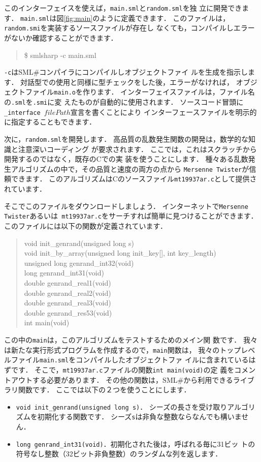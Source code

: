 \documentclass{jbook}
\newcommand{\smlsharp}{SML\#}
\newenvironment{program}{\begin{quote}\begin{tt}}%
                        {\end{tt}\end{quote}}
\begin{document}
	このインターフェイスを使えば，{\tt main.sml}と{\tt random.sml}を独
立に開発できます．
	{\tt main.sml}は図\ref{fig:main}のように定義できます．
	このファイルは，{\tt random.smi}を実装するソースファイルが存在し
なくても，コンパイルしエラーがないか確認することができます．
\begin{program}
\$ smlsharp -c main.sml
\end{program}
	{\tt -c}は\smlsharp{}コンパイラにコンパイルしオブジェクトファイ
ルを生成を指示します．
	対話型での使用と同様に型チェックをした後，エラーがなければ，
オブジェクトファイル{\tt main.o}を作ります．
	インターフェイスファイルは，ファイル名の{\tt .sml}を{\tt .smi}に変
えたものが自動的に使用されます．
	ソースコード冒頭に{\tt \_interface $filePath$}宣言を書くことにより
インターフェースファイルを明示的に指定することもできます．

	次に，{\tt random.sml}を開発します．
	高品質の乱数発生関数の開発は，数学的な知識と注意深いコーディング
が要求されます．
	ここでは，これはスクラッチから開発するのではなく，既存のCでの実
装を使うことにします．
	種々ある乱数発生アルゴリズムの中で，その品質と速度の両方の点から
{\tt Mersenne Twister}が信頼できます．
	このアルゴリズムはCのソースファイル{\tt mt19937ar.c}として提供されています．

	そこでこのファイルをダウンロードしましょう．
	インターネットで{\tt Mersenne Twister}あるいは{\tt
mt19937ar.c}をサーチすれば簡単に見つけることができます．
	このファイルには以下の関数が定義されています．
\begin{program}
void init\_genrand(unsigned long s)\\
void init\_by\_array(unsigned long init\_key[], int key\_length)\\
unsigned long genrand\_int32(void)\\
long genrand\_int31(void)\\
double genrand\_real1(void)\\
double genrand\_real2(void)\\
double genrand\_real3(void)\\
double genrand\_res53(void)\\
int main(void)
\end{program}
	この中の{\tt main}は，このアルゴリズムをテストするためのメイン関
数です．
	我々は新たな実行形式プログラムを作成するので，{\tt main}関数は，
我々のトップレベルファイル{\tt main.sml}をコンパイルしたオブジェクトファ
イルに含まれているはずです．
	そこで，{\tt mt19937ar.c}ファイルの関数{\tt int main(void)}の定
義をコメントアウトする必要があります．
	その他の関数は，\smlsharp{}から利用できるライブラリ関数です．
	ここでは以下の２つを使うことにします．
\begin{itemize}
\item {\tt void init\_genrand(unsigned long s)}．
シーズの長さを受け取りアルゴリズムを初期化する関数です．
シーズ{\tt s}は非負な整数ならなんでも構いません．
\item {\tt long genrand\_int31(void)}．初期化された後は，呼ばれる毎に31ビッ
トの符号なし整数（32ビット非負整数）のランダムな列を返します．
\end{itemize}
\end{document}
